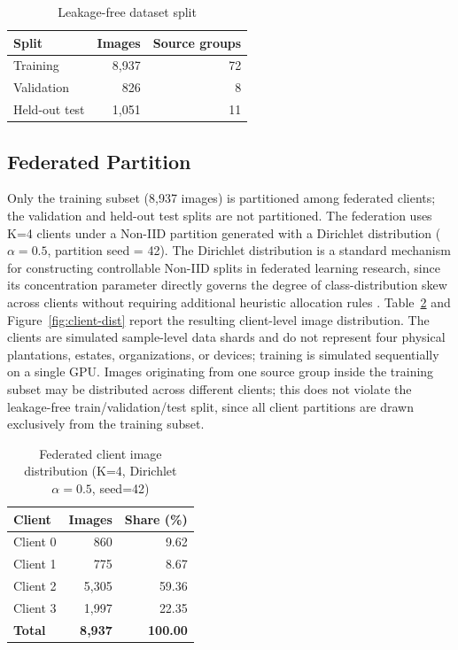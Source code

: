 \documentclass[11pt]{article}
\begin{document}
\begin{table}[H]
  \centering
  \caption{Leakage-free dataset split}
  \label{tab:split}
  \begin{tabular}{lrr}
    \toprule
    Split & Images & Source groups \\
    \midrule
    Training      & 8,937 & 72 \\
    Validation    & 826   & 8  \\
    Held-out test & 1,051 & 11 \\
    \bottomrule
  \end{tabular}
\end{table}

\subsection{Federated Partition}
Only the training subset (8,937 images) is partitioned among federated clients; the validation and held-out test splits are not partitioned. The federation uses K=4 clients under a Non-IID partition generated with a Dirichlet distribution ($\alpha = 0.5$, partition seed = 42). The Dirichlet distribution is a standard mechanism for constructing controllable Non-IID splits in federated learning research, since its concentration parameter directly governs the degree of class-distribution skew across clients without requiring additional heuristic allocation rules \cite{kairouz2021}. Table~\ref{tab:clients} and Figure~\ref{fig:client-dist} report the resulting client-level image distribution. The clients are simulated sample-level data shards and do not represent four physical plantations, estates, organizations, or devices; training is simulated sequentially on a single GPU. Images originating from one source group inside the training subset may be distributed across different clients; this does not violate the leakage-free train/validation/test split, since all client partitions are drawn exclusively from the training subset.

\begin{table}[H]
  \centering
  \caption{Federated client image distribution (K=4, Dirichlet $\alpha=0.5$, seed=42)}
  \label{tab:clients}
  \begin{tabular}{lrr}
    \toprule
    Client & Images & Share (\%) \\
    \midrule
    Client 0 & 860   & 9.62  \\
    Client 1 & 775   & 8.67  \\
    Client 2 & 5,305 & 59.36 \\
    Client 3 & 1,997 & 22.35 \\
    \midrule
    \textbf{Total} & \textbf{8,937} & \textbf{100.00} \\
    \bottomrule
  \end{tabular}
\end{table}
\end{document}
